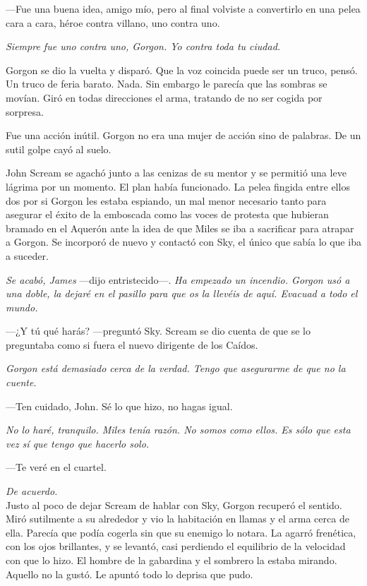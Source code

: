 ---Fue una buena idea, amigo mío, pero al final volviste a convertirlo en una pelea cara a cara, héroe contra villano, uno contra uno.

\emph{Siempre fue uno contra uno, Gorgon. Yo contra toda tu ciudad.}

Gorgon se dio la vuelta y disparó. Que la voz coincida puede ser un truco, pensó. Un truco de feria barato. Nada. Sin embargo le parecía que las sombras se movían. Giró en todas direcciones el arma, tratando de no ser cogida por sorpresa.

Fue una acción inútil. Gorgon no era una mujer de acción sino de palabras. De un sutil golpe cayó al suelo.

John Scream se agachó junto a las cenizas de su mentor y se permitió una leve lágrima por un momento. El plan había funcionado. La pelea fingida entre ellos dos por si Gorgon les estaba espiando, un mal menor necesario tanto para asegurar el éxito de la emboscada como las voces de protesta que hubieran bramado en el Aquerón ante la idea de que Miles se iba a sacrificar para atrapar a Gorgon. Se incorporó de nuevo y contactó con Sky, el único que sabía lo que iba a suceder.

\emph{Se acabó, James} ---dijo entristecido---. \emph{Ha empezado un incendio. Gorgon usó a una doble, la dejaré en el pasillo para que os la llevéis de aquí. Evacuad a todo el mundo.}

---¿Y tú qué harás? ---preguntó Sky. Scream se dio cuenta de que se lo preguntaba como si fuera el nuevo dirigente de los Caídos.

\emph{Gorgon está demasiado cerca de la verdad. Tengo que asegurarme de que no la cuente.}

---Ten cuidado, John. Sé lo que hizo, no hagas igual.

\emph{No lo haré, tranquilo. Miles tenía razón. No somos como ellos. Es sólo que esta vez sí que tengo que hacerlo solo.}

---Te veré en el cuartel.

\emph{De acuerdo.}\\

\noindent{}Justo al poco de dejar Scream de hablar con Sky, Gorgon recuperó el sentido. Miró sutilmente a su alrededor y vio la habitación en llamas y el arma cerca de ella. Parecía que podía cogerla sin que su enemigo lo notara. La agarró frenética, con los ojos brillantes, y se levantó, casi perdiendo el equilibrio de la velocidad con que lo hizo. El hombre de la gabardina y el sombrero la estaba mirando. Aquello no la gustó. Le apuntó todo lo deprisa que pudo.

